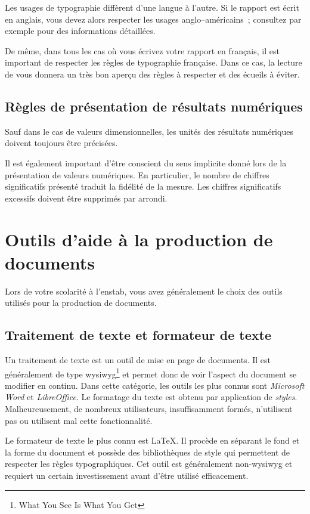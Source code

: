 Les usages de typographie diffèrent d'une langue à l'autre. Si le rapport est
écrit en anglais, vous devez alors respecter les usages
anglo--américains~; consultez par exemple \cite{typoUS} pour des
informations détaillées. 

De même, dans tous les cas où vous écrivez votre rapport en
français, il est important de respecter les règles de typographie française.
Dans ce cas,
la lecture de \cite{andreTypo} vous donnera un très bon aperçu des règles
à respecter et des écueils à éviter.

\subsection{Règles de présentation de résultats numériques}

Sauf dans le cas de valeurs dimensionnelles, les unités des résultats
numériques doivent toujours être précisées. 

Il est également important d'être conscient du sens implicite donné lors de la
présentation de valeurs numériques. En particulier, le nombre de chiffres
significatifs présenté traduit la fidélité de la mesure. Les chiffres
significatifs excessifs doivent être supprimés par arrondi.

\section{Outils d'aide à la production de documents}
\label{sec:outils}

Lors de votre scolarité à l'\gls{enstab}, vous avez généralement le
choix des outils utilisés pour la production de documents. 

\subsection{Traitement de texte et formateur de texte}

Un traitement de texte est un outil de mise en page de documents. Il est
généralement de type \gls{wysiwyg}\footnote{What You See Is What You Get}
et permet donc de voir l'aspect du document se modifier en continu. Dans cette
catégorie, les outils les plus connus sont \emph{Microsoft Word} et
\emph{LibreOffice}. Le formatage du texte est
obtenu par application de {\em styles}. Malheureusement, de nombreux
utilisateurs, insuffisamment formés, n'utilisent pas ou utilisent mal
cette fonctionnalité.

Le formateur de texte le plus connu est \LaTeX. Il procède en séparant le fond
et la forme du document et possède des bibliothèques de style qui permettent
de respecter les règles typographiques. Cet outil est généralement
non-\gls{wysiwyg} et requiert un certain investissement avant d'être
utilisé efficacement.

